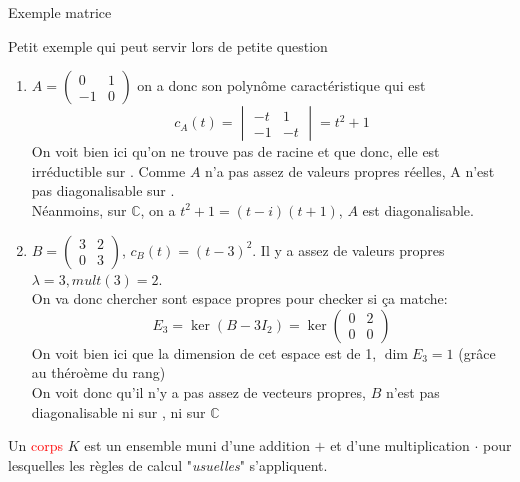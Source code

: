 \begin{parag}{Exemple matrice}
        \begin{subparag}{Petit exemple qui peut servir lors de petite question}
        \begin{enumerate}
            \item $A = \begin{pmatrix}
                0 & 1\\ -1 & 0
            \end{pmatrix}$ on a donc son polynôme caractéristique qui est 
            \[c_A(t) = \begin{vmatrix}
                -t & 1\\ -1 & -t
            \end{vmatrix} = t^2 + 1\]
            On voit bien ici qu'on ne trouve pas de racine et que donc, elle est irréductible sur \R. Comme $A$ n'a pas assez de valeurs propres réelles, A n'est pas diagonalisable sur \R.
            \\
            Néanmoins, sur $\mathbb{C}$, on a $t^2 + 1 = (t-i)(t+1)$, $A$ est diagonalisable.
            \item $B = \begin{pmatrix}
                3 & 2\\0 & 3
            \end{pmatrix}$, $c_B(t) = (t-3)^2$. Il y a assez de valeurs propres $\lambda = 3, mult(3) = 2$.
            \\
            On va donc chercher sont espace propres pour checker si ça matche:
            \[E_3 =\ker(B - 3I_2) =  \ker \begin{pmatrix}
                0 & 2\\ 0 & 0
            \end{pmatrix}\]
            On voit bien ici que la dimension de cet espace est de 1, $\dim E_3 = 1$ (grâce au théroème du rang)\\
            On voit donc qu'il n'y a pas assez de vecteurs propres, $B$ n'est pas diagonalisable ni sur \R, ni sur $\mathbb{C}$
        \end{enumerate}
    
            
        \end{subparag}
\end{parag}        
    \begin{definition}
        Un \textcolor{red}{corps} $K$ est un ensemble muni d'une addition $+$ et d'une multiplication $\cdot$ pour lesquelles les règles de calcul "\textit{usuelles}" s'appliquent.
    \end{definition}
